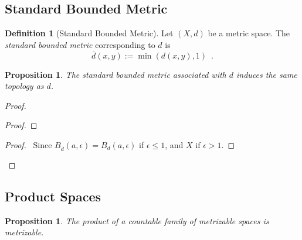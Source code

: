 \documentclass{book}
\let\qed\relax
\newtheorem{prop}[ax]{Proposition}
\theoremstyle{definition}
\newtheorem{df}[ax]{Definition}
\begin{document}
\subsection{Standard Bounded Metric}

\begin{df}[Standard Bounded Metric]
Let $(X,d)$ be a metric space. The \emph{standard bounded metric} corresponding to $d$ is
\[ \overline{d}(x,y) := \min(d(x,y),1) \enspace . \]
\end{df}

\begin{prop}
The standard bounded metric associated with $d$ induces the same topology as $d$.
\end{prop}

\begin{proof}
\pf
{}
\begin{proof}
\end{proof}
\begin{proof}
	\pf\ Since $B_{\overline{d}}(a, \epsilon) = B_d(a, \epsilon)$ if $\epsilon \leq 1$, and $X$ if $\epsilon > 1$.
\end{proof}
\qed
\end{proof}

\subsection{Product Spaces}

\begin{prop}
The product of a countable family of metrizable spaces is metrizable.
\end{prop}
\end{document}
